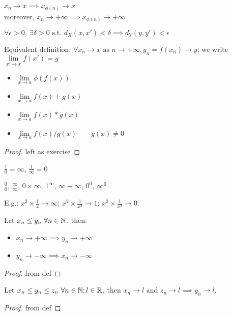 \begin{property}
	$x_n \to x \implies x_{\phi(n)} \to x$ \\
	moreover, $x_n \to +\infty \implies x_{\phi(n)} \to +\infty$
\end{property}

\begin{definition}[$f:X \to Y$ converges to $y \in Y$ at $x \in X$]
	$\forall \epsilon>0, \ \exists \delta>0 \text{ s.t. } d_X(x,x')<\delta \implies d_Y(y,y')<\epsilon$
\end{definition}
Equivalent definition: $\forall x_n \to x \text{ as } n \to +\infty, y_n = f(x_n) \to y$; we write $\lim\limits_{x' \to x} f(x') = y$

\begin{question}
	\begin{itemize}
		\item $\lim\limits_{x \to a} \phi(f(x))$
		\item $\lim\limits_{x \to a} f(x)+g(x)$
		\item $\lim\limits_{x \to a} f(x)*g(x)$
		\item $\lim\limits_{x \to a} f(x)/g(x) \qquad g(x) \neq 0$
	\end{itemize}
\end{question}
\begin{proof}
	left as exercise
\end{proof}

\begin{property}
	$\frac{1}{0} = \infty$, $\frac{1}{\infty} = 0$
\end{property}
\begin{property}
	$\frac{0}{0}$, $\frac{\infty}{\infty}$, $0 \times \infty$, $1^\infty$, $\infty - \infty$, $0^0$, $\infty^0$
\end{property}
E.g.: $x^2 \times \frac{1}{x} \to \infty$; $x^2 \times \frac{1}{x^2} \to 1$; $x^2 \times \frac{1}{x^3} \to 0$.

\begin{theorem}
	Let $x_n \leq y_n \ \forall n \in \mathbb{N}$, then:
	\begin{itemize}
		\item $x_n \to +\infty \implies y_n \to +\infty$
		\item $y_n \to -\infty \implies x_n \to -\infty$
	\end{itemize}
\end{theorem}
\begin{proof}
	from def
\end{proof}
\begin{theorem}
	Let $x_n \leq y_n \leq z_n \ \forall n \in \mathbb{N}; l \in \mathbb{R}$, then $x_n \to l \text{ and } z_n \to l \implies y_n \to l$.
\end{theorem}
\begin{proof}
	from def
\end{proof}

